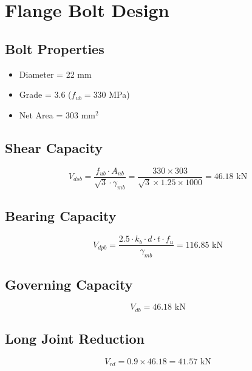 \section{Flange Bolt Design}

\subsection{Bolt Properties}
\begin{itemize}
    \item Diameter = 22 mm
    \item Grade = 3.6 ($f_{ub} = 330$ MPa)
    \item Net Area = 303 mm$^2$
\end{itemize}

\subsection{Shear Capacity}

\begin{equation}
V_{dsb} = \frac{f_{ub} \cdot A_{nb}}{\sqrt{3} \cdot \gamma_{mb}}
= \frac{330 \times 303}{\sqrt{3} \times 1.25 \times 1000}
= 46.18 \text{ kN}
\end{equation}

\subsection{Bearing Capacity}

\begin{equation}
V_{dpb} = \frac{2.5 \cdot k_b \cdot d \cdot t \cdot f_u}{\gamma_{mb}} = 116.85 \text{ kN}
\end{equation}

\subsection{Governing Capacity}

\begin{equation}
V_{db} = 46.18 \text{ kN}
\end{equation}

\subsection{Long Joint Reduction}

\begin{equation}
V_{rd} = 0.9 \times 46.18 = 41.57 \text{ kN}
\end{equation}

